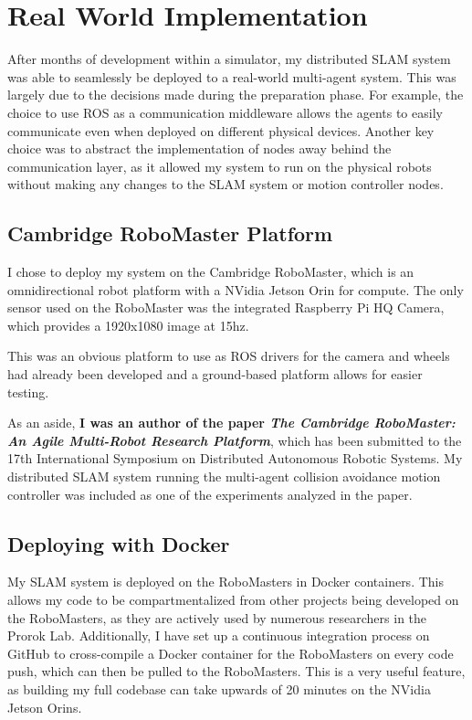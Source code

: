 \section{Real World Implementation}
\label{sec:real-world-implementation}
After months of development within a simulator, my distributed SLAM system was able to seamlessly be deployed to a real-world multi-agent system. This was largely due to the decisions made during the preparation phase. For example, the choice to use ROS as a communication middleware allows the agents to easily communicate even when deployed on different physical devices. Another key choice was to abstract the implementation of nodes away behind the communication layer, as it allowed my system to run on the physical robots without making any changes to the SLAM system or motion controller nodes.

\subsection{Cambridge RoboMaster Platform}
\label{sec:cambridge-robomaster-platform}
I chose to deploy my system on the Cambridge RoboMaster, which is an omnidirectional robot platform with a NVidia Jetson Orin for compute. The only sensor used on the RoboMaster was the integrated Raspberry Pi HQ Camera, which provides a 1920x1080 image at 15hz.

This was an obvious platform to use as ROS drivers for the camera and wheels had already been developed and a ground-based platform allows for easier testing.

As an aside, \textbf{I was an author of the paper \textit{The Cambridge RoboMaster: An Agile Multi-Robot Research Platform}}, which has been submitted to the 17th International Symposium on Distributed Autonomous Robotic Systems. My distributed SLAM system running the multi-agent collision avoidance motion controller was included as one of the experiments analyzed in the paper.

\subsection{Deploying with Docker}
\label{sec:deploying-with-docker}
My SLAM system is deployed on the RoboMasters in Docker containers. This allows my code to be compartmentalized from other projects being developed on the RoboMasters, as they are actively used by numerous researchers in the Prorok Lab. Additionally, I have set up a continuous integration process on GitHub to cross-compile a Docker container for the RoboMasters on every code push, which can then be pulled to the RoboMasters. This is a very useful feature, as building my full codebase can take upwards of 20 minutes on the NVidia Jetson Orins.

